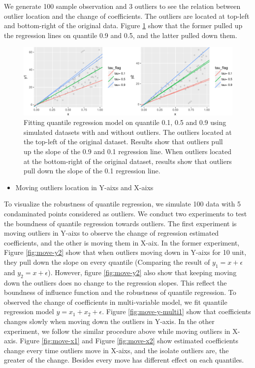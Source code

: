 \documentclass[11pt,a4paper,]{article}
\providecommand{\tightlist}{%
  \setlength{\itemsep}{0pt}\setlength{\parskip}{0pt}}
\theoremstyle{definition}
\theoremstyle{definition}
\theoremstyle{remark}
\begin{document}
We generate 100 sample observation and 3 outliers to see the relation
between outlier location and the change of coefficients. The outliers
are located at top-left and bottom-right of the original data. Figure
\ref{fig:qr-outlier} show that the former pulled up the regression lines
on quantile 0.9 and 0.5, and the latter pulled down them.

\begin{figure}

{\centering \includegraphics{main_files/figure-latex/qr-outlier-1} 

}

\caption{Fitting quantile regression model on quantile 0.1, 0.5 and 0.9 using simulated datasets with and without outliers. The outliers located at the top-left of the original dataset. Results show that outliers pull up the slope of the 0.9 and 0.1 regression line. When outliers located at the bottom-right of the original dataset, results show that outliers pull down the slope of the 0.1 regression line.}\label{fig:qr-outlier}
\end{figure}

\begin{itemize}
\tightlist
\item
  Moving outliers location in Y-aixs and X-aixs
\end{itemize}

To visualize the robustness of quantile regression, we simulate 100 data
with 5 condaminated points considered as outliers. We conduct two
experiments to test the boundness of quantile regression towards
outliers. The first experiment is moving outliers in Y-aixs to observe
the change of regression estimated coefficients, and the other is moving
them in X-aix. In the former experiment, Figure \ref{fig:move-y2} show
that when outliers moving down in Y-aixs for 10 unit, they pull down the
slope on every quantile (Comparing the result of \(y_{1}=x+\epsilon\)
and \(y_{2}=x+\epsilon\)). However, figure \ref{fig:move-y2} also show
that keeping moving down the outliers does no change to the regression
slopes. This reflect the boundness of influence function and the
robustness of quantile regression. To observed the change of
coefficients in multi-variable model, we fit quantile regression model
\(y=x_{1}+x_{2}+\epsilon\). Figure \ref{fig:move-y-multi1} show that
coefficients changes slowly when moving down the outliers in Y-axis. In
the other experiment, we follow the similar procedure above while moving
outliers in X-axis. Figure \ref{fig:move-x1} and Figure
\ref{fig:move-x2} show estimated coefficients change every time outliers
move in X-aixs, and the isolate outliers are, the greater of the change.
Besides every move has different effect on each quantiles.
\end{document}
